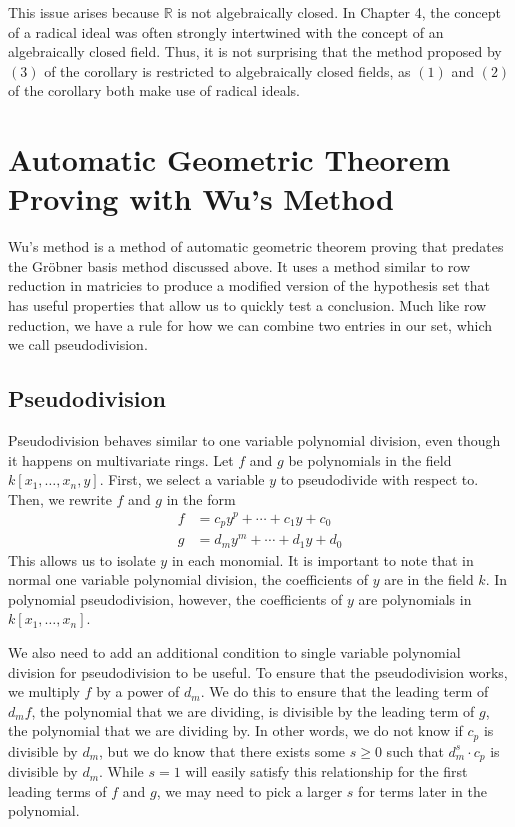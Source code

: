 \documentclass[12pt]{article}
\theoremstyle{plain}
\theoremstyle{definition}
\theoremstyle{remark}
\newcommand{\gro}{Gr\"obner }
\begin{document}
This issue arises because $\mathbb{R}$ is not algebraically closed. In Chapter 4, the concept of a radical ideal was often strongly intertwined with the concept of an algebraically closed field.
Thus, it is not surprising that the method proposed by $(3)$ of the corollary is restricted to algebraically closed fields, as $(1)$ and $(2)$ of the corollary both make use of radical ideals.

\section{Automatic Geometric Theorem Proving with Wu's Method}
Wu's method is a method of automatic geometric theorem proving that predates the \gro basis method discussed above. 
It uses a method similar to row reduction in matricies to produce a modified version of the hypothesis set that has useful properties that allow us to quickly test a conclusion.
Much like row reduction, we have a rule for how we can combine two entries in our set, which we call pseudodivision.
\subsection{Pseudodivision}
Pseudodivision behaves similar to one variable polynomial division, even though it happens on multivariate rings. Let $f$ and $g$ be polynomials in the field $k[x_1,\dots,x_n,y]$.
First, we select a variable $y$ to pseudodivide with respect to. Then, we rewrite $f$ and $g$ in the form 
\begin {align*}
    f & = c_py^p + \cdots + c_1y + c_0\\
    g & = d_my^m + \cdots + d_1y + d_0
\end{align*}
This allows us to isolate $y$ in each monomial. It is important to note that in normal one variable polynomial division, the coefficients of $y$ are in the field $k$. 
In polynomial pseudodivision, however, the coefficients of $y$ are polynomials in $k[x_1,\dots,x_n]$.

We also need to add an additional condition to single variable polynomial division for pseudodivision to be useful. 
To ensure that the pseudodivision works, we multiply $f$ by a power of $d_m$. 
We do this to ensure that the leading term of $d_m f$, the polynomial that we are dividing, is divisible by the leading term of $g$, the polynomial that we are dividing by. 
In other words, we do not know if $c_p$ is divisible by $d_m$, but we do know that there exists some $s \geq 0$ such that $d_m^s\cdot c_p$ is divisible by $d_m$.
While $s = 1$ will easily satisfy this relationship for the first leading terms of $f$ and $g$, we may need to pick a larger $s$ for terms later in the polynomial.
\end{document}

